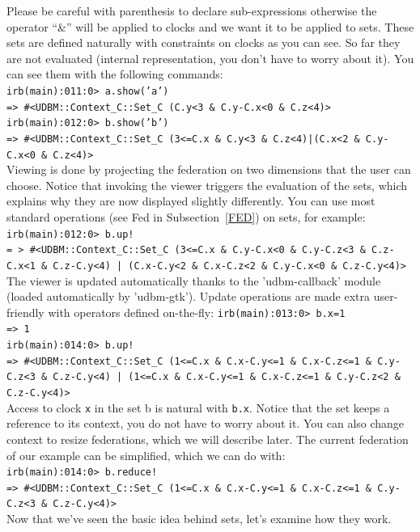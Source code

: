 \documentclass[a4paper]{report}
\begin{document}
\newline
Please be careful with parenthesis to declare sub-expressions
otherwise the operator ``\&'' will be applied to clocks and we
want it to be applied to sets. These sets are defined naturally with
constraints on clocks as you can see. So far they are not evaluated
(internal representation, you don't have to worry about it). You can
see them with the following commands:\\
\newline
{\tt  irb(main):011:0> a.show('a')\\
=> \#<UDBM::Context\_C::Set\_C (C.y<3 \& C.y-C.x<0 \& C.z<4)>\\
irb(main):012:0> b.show('b')\\
=> \#<UDBM::Context\_C::Set\_C (3<=C.x \& C.y<3 \& C.z<4)|(C.x<2 \&
C.y-C.x<0 \& C.z<4)>}\\
\newline
Viewing is done by projecting the federation on two dimensions that
the user can choose. Notice that invoking the viewer triggers the
evaluation of the sets, which explains why they are now displayed
slightly differently. You can use most standard operations (see Fed in
Subsection~\ref{FED}) on sets, for example:\\
\newline
{\tt irb(main):012:0> b.up!\\
= > \#<UDBM::Context\_C::Set\_C (3<=C.x \& C.y-C.x<0 \& C.y-C.z<3 \&
C.z-C.x<1 \& C.z-C.y<4) | (C.x-C.y<2 \& C.x-C.z<2 \& C.y-C.x<0 \&
C.z-C.y<4)>}\\
\newline
The viewer is updated automatically thanks to the 'udbm-callback'
module (loaded automatically by 'udbm-gtk'). Update operations are
made extra user-friendly with operators defined on-the-fly:
\newline
{\tt irb(main):013:0> b.x=1\\
=> 1\\
irb(main):014:0> b.up!\\
=> \#<UDBM::Context\_C::Set\_C (1<=C.x \& C.x-C.y<=1 \& C.x-C.z<=1 \&
C.y-C.z<3 \& C.z-C.y<4) | (1<=C.x \& C.x-C.y<=1 \& C.x-C.z<=1 \&
C.y-C.z<2 \& C.z-C.y<4)>}\\
\newline
Access to clock {\tt x} in the set b is natural with {\tt b.x}. Notice
that the set keeps a reference to its context, you do not have to
worry about it. You can also change context to resize federations,
which we will describe later. The current federation of our example
can be simplified, which we can do with:\\
\newline
{\tt irb(main):014:0> b.reduce!\\
=> \#<UDBM::Context\_C::Set\_C (1<=C.x \& C.x-C.y<=1 \& C.x-C.z<=1 \&
C.y-C.z<3 \& C.z-C.y<4)>}\\
\newline
Now that we've seen the basic idea behind sets, let's examine how they
work.
\end{document}
